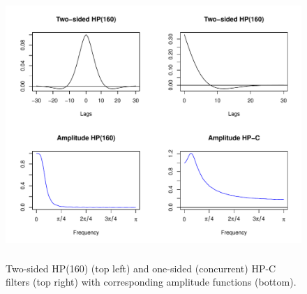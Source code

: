 \documentclass[11pt,a4paper]{article}
\begin{document}
\begin{figure}[h]
    \begin{center}
        \includegraphics[height=4in, width=5.5in]{./Figures/hp_160.pdf}
        \caption{Two-sided HP(160) (top left) and one-sided (concurrent) HP-C filters (top right) with corresponding amplitude functions (bottom).
        \label{hp_160}}
    \end{center}
\end{figure}


\end{document}
